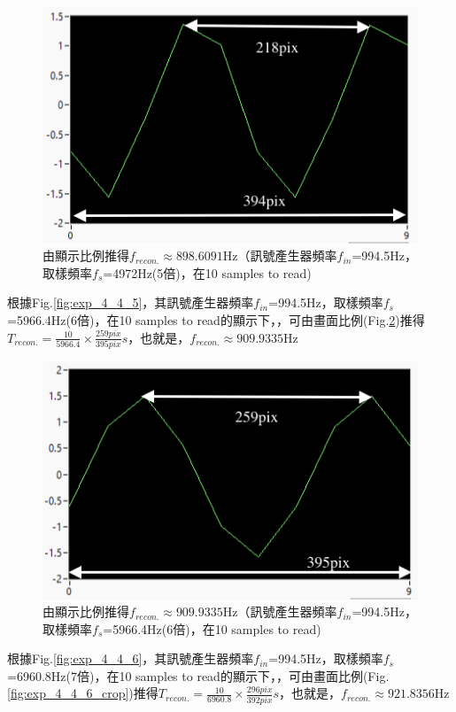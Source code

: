 \documentclass[12pt,a4paper]{article}
\begin{document}
\begin{CJK}{UTF8}{bkai}
\begin{enumerate}
\begin{figure}[h]
    \centering
    \includegraphics[width=0.6\linewidth]{figures/exp_4_4_4_crop.png}
    \caption{由顯示比例推得$f_{recon.}\approx898.6091$Hz（訊號產生器頻率$f_{in}$=994.5Hz，取樣頻率$f_{s}$=4972Hz(5倍)，在10 samples to read)}
    \label{fig:exp_4_4_4_crop}
\end{figure}

根據Fig.\ref{fig:exp_4_4_5}，其訊號產生器頻率$f_{in}$=994.5Hz，取樣頻率$f_{s}$=5966.4Hz(6倍)，在10 samples to read的顯示下，，可由畫面比例(Fig.\ref{fig:exp_4_4_5_crop})推得$T_{recon.}=\frac{10}{5966.4}\times\frac{259pix}{395pix}s$，也就是，$f_{recon.}\approx909.9335$Hz

\begin{figure}[h]
    \centering
    \includegraphics[width=0.6\linewidth]{figures/exp_4_4_5_crop.png}
    \caption{由顯示比例推得$f_{recon.}\approx909.9335$Hz（訊號產生器頻率$f_{in}$=994.5Hz，取樣頻率$f_{s}$=5966.4Hz(6倍)，在10 samples to read)}
    \label{fig:exp_4_4_5_crop}
\end{figure}

\clearpage

根據Fig.\ref{fig:exp_4_4_6}，其訊號產生器頻率$f_{in}$=994.5Hz，取樣頻率$f_{s}$=6960.8Hz(7倍)，在10 samples to read的顯示下，，可由畫面比例(Fig.\ref{fig:exp_4_4_6_crop})推得$T_{recon.}=\frac{10}{6960.8}\times\frac{296pix}{392pix}s$，也就是，$f_{recon.}\approx921.8356$Hz


\end{enumerate}
\end{CJK}
\end{document}
